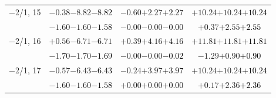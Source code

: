 \documentclass[compress]{beamer}
\begin{document}
\begin{frame}
\begin{tabular}{r | c | c | c}
$-$2/1, 15 & $-0.38$\hspace{0.1 cm}$-8.82$\hspace{0.1 cm}\textcolor{black}{$-8.82$} & $-0.60$\hspace{0.1 cm}$+2.27$\hspace{0.1 cm}\textcolor{black}{$+2.27$} & $+10.24$\hspace{0.1 cm}$+10.24$\hspace{0.1 cm}\textcolor{black}{$+10.24$} \\
           & $-1.60$\hspace{0.1 cm}$-1.60$\hspace{0.1 cm}\textcolor{black}{$-1.58$} & $-0.00$\hspace{0.1 cm}$-0.00$\hspace{0.1 cm}\textcolor{black}{$-0.00$} & $+0.37$\hspace{0.1 cm}$+2.55$\hspace{0.1 cm}\textcolor{black}{$+2.55$} \\
$-$2/1, 16 & $+0.56$\hspace{0.1 cm}$-6.71$\hspace{0.1 cm}\textcolor{black}{$-6.71$} & $+0.39$\hspace{0.1 cm}$+4.16$\hspace{0.1 cm}\textcolor{black}{$+4.16$} & $+11.81$\hspace{0.1 cm}$+11.81$\hspace{0.1 cm}\textcolor{black}{$+11.81$} \\
           & $-1.70$\hspace{0.1 cm}$-1.70$\hspace{0.1 cm}\textcolor{black}{$-1.69$} & $-0.00$\hspace{0.1 cm}$-0.00$\hspace{0.1 cm}\textcolor{black}{$-0.02$} & $-1.29$\hspace{0.1 cm}$+0.90$\hspace{0.1 cm}\textcolor{black}{$+0.90$} \\
$-$2/1, 17 & $-0.57$\hspace{0.1 cm}$-6.43$\hspace{0.1 cm}\textcolor{black}{$-6.43$} & $-0.24$\hspace{0.1 cm}$+3.97$\hspace{0.1 cm}\textcolor{black}{$+3.97$} & $+10.24$\hspace{0.1 cm}$+10.24$\hspace{0.1 cm}\textcolor{black}{$+10.24$} \\
           & $-1.60$\hspace{0.1 cm}$-1.60$\hspace{0.1 cm}\textcolor{black}{$-1.58$} & $+0.00$\hspace{0.1 cm}$+0.00$\hspace{0.1 cm}\textcolor{black}{$+0.00$} & $+0.17$\hspace{0.1 cm}$+2.36$\hspace{0.1 cm}\textcolor{black}{$+2.36$} \\

\end{tabular}
\end{frame}
\end{document}

